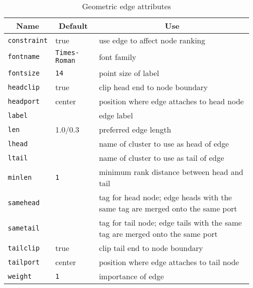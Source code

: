 \begin{table}[htbp]\footnotesize
\centering
\begin{tabular}[t]{|l|l|p{2.5in}|} \hline
\multicolumn{1}{|c|}{Name} & \multicolumn{1}{c|}{Default} & \multicolumn{1}{c|}{Use} \\ \hline
{\tt constraint} & true & use edge to affect node ranking \\
{\tt fontname} & {\tt Times-Roman} & font family \\
{\tt fontsize} & {\tt 14} & point size of label \\
{\tt headclip} & true & clip head end to node boundary \\
{\tt headport} & center & position where edge attaches to head node \\
{\tt label} & & edge label \\
{\tt len} & 1.0/0.3 & preferred edge length \\
{\tt lhead} & & name of cluster to use as head of edge \\
{\tt ltail} & & name of cluster to use as tail of edge \\
{\tt minlen} & {\tt 1} & minimum rank distance between head and tail \\
{\tt samehead} & & tag for head node; edge heads with the same tag are merged
 onto the same port \\
{\tt sametail} & & tag for tail node; edge tails with the same tag are merged
 onto the same port \\
{\tt tailclip} & true & clip tail end to node boundary \\
{\tt tailport} & center & position where edge attaches to tail node \\
{\tt weight} & {\tt 1} & importance of edge \\
\hline
\end{tabular}
\caption{Geometric edge attributes}
\label{tab:eattr_geom}
\end{table}
